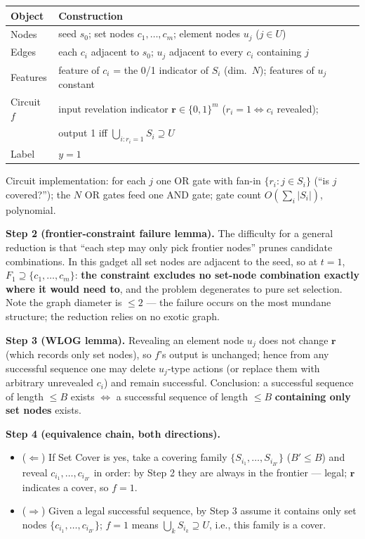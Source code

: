 \documentclass{article}
\begin{document}
\begin{center}
\begin{tabular}{ll}
\toprule
Object & Construction \\
\midrule
Nodes & seed $s_0$; set nodes $c_1,\dots,c_m$; element nodes $u_j$ ($j\in U$) \\
Edges & each $c_i$ adjacent to $s_0$; $u_j$ adjacent to every $c_i$ containing $j$ \\
Features & feature of $c_i$ = the 0/1 indicator of $S_i$ (dim.\ $N$); features of $u_j$ constant \\
Circuit $f$ & input revelation indicator $\mathbf r\in\{0,1\}^m$ ($r_i=1\iff c_i$ revealed); \\
 & output 1 iff $\bigcup_{i:r_i=1}S_i\supseteq U$ \\
Label & $y=1$ \\
\bottomrule
\end{tabular}
\end{center}

Circuit implementation: for each $j$ one OR gate with fan-in $\{r_i:j\in S_i\}$ (``is $j$ covered?''); the $N$ OR gates feed one AND gate; gate count $O(\sum_i|S_i|)$, polynomial.

\textbf{Step 2 (frontier-constraint failure lemma).} The difficulty for a general reduction is that ``each step may only pick frontier nodes'' prunes candidate combinations. In this gadget all set nodes are adjacent to the seed, so at $t=1$, $F_1\supseteq\{c_1,\dots,c_m\}$: \textbf{the constraint excludes no set-node combination exactly where it would need to}, and the problem degenerates to pure set selection. Note the graph diameter is $\le2$ --- the failure occurs on the most mundane structure; the reduction relies on no exotic graph.

\textbf{Step 3 (WLOG lemma).} Revealing an element node $u_j$ does not change $\mathbf r$ (which records only set nodes), so $f$'s output is unchanged; hence from any successful sequence one may delete $u_j$-type actions (or replace them with arbitrary unrevealed $c_i$) and remain successful. Conclusion: a successful sequence of length $\le B$ exists $\iff$ a successful sequence of length $\le B$ \textbf{containing only set nodes} exists.

\textbf{Step 4 (equivalence chain, both directions).}
\begin{itemize}
\item ($\Leftarrow$) If Set Cover is yes, take a covering family $\{S_{i_1},\dots,S_{i_{B'}}\}$ ($B'\le B$) and reveal $c_{i_1},\dots,c_{i_{B'}}$ in order: by Step 2 they are always in the frontier --- legal; $\mathbf r$ indicates a cover, so $f=1$.
\item ($\Rightarrow$) Given a legal successful sequence, by Step 3 assume it contains only set nodes $\{c_{i_1},\dots,c_{i_{B'}}\}$; $f=1$ means $\bigcup_k S_{i_k}\supseteq U$, i.e., this family is a cover.
\end{itemize}
\end{document}
